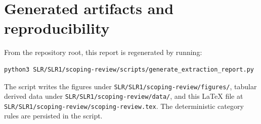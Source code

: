 \documentclass[11pt]{article}
\begin{document}
\section{Generated artifacts and reproducibility}
From the repository root, this report is regenerated by running:
\begin{verbatim}
python3 SLR/SLR1/scoping-review/scripts/generate_extraction_report.py
\end{verbatim}
The script writes the figures under \texttt{SLR/SLR1/scoping-review/figures/}, tabular derived data under \texttt{SLR/SLR1/scoping-review/data/}, and this LaTeX file at \texttt{SLR/SLR1/scoping-review/scoping-review.tex}.  The deterministic category rules are persisted in the script.
\end{document}
